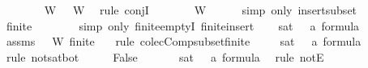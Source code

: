 \begin{isabellebody}
\ \ \ \ \isamarkupfalse%
\ {\isacartoucheopen}{\isasymbottom}\ {\isasymin}\ W{\isacartoucheclose}\ {\isacartoucheopen}{\isacharbraceleft}{\isacharbraceright}\ {\isasymsubseteq}\ W{\isacartoucheclose}\ \isamarkupfalse%
\ {\isacharparenleft}rule\ conjI{\isacharparenright}\isanewline
\ \ \isamarkupfalse%
\ \isamarkupfalse%
\ {\isachardoublequoteopen}{\isacharbraceleft}{\isasymbottom}{\isacharbraceright}\ {\isasymsubseteq}\ W{\isachardoublequoteclose}\isanewline
\ \ \ \ \isamarkupfalse%
\ {\isacharparenleft}simp\ only{\isacharcolon}\ insert{\isacharunderscore}subset{\isacharparenright}\isanewline
\ \ \isamarkupfalse%
\ {\isachardoublequoteopen}finite\ {\isacharbraceleft}{\isasymbottom}{\isacharbraceright}{\isachardoublequoteclose}\ \isanewline
\ \ \ \ \isamarkupfalse%
\ {\isacharparenleft}simp\ only{\isacharcolon}\ finite{\isachardot}emptyI\ finite{\isacharunderscore}insert{\isacharparenright}\isanewline
\ \ \isamarkupfalse%
\ {\isachardoublequoteopen}sat\ {\isacharbraceleft}{\isasymbottom}\ {\isacharcolon}{\isacharcolon}\ {\isacharprime}a\ formula{\isacharbraceright}{\isachardoublequoteclose}\ \isanewline
\ \ \ \ \isamarkupfalse%
\ assms\ {\isacartoucheopen}{\isacharbraceleft}{\isasymbottom}{\isacharbraceright}\ {\isasymsubseteq}\ W{\isacartoucheclose}\ {\isacartoucheopen}finite\ {\isacharbraceleft}{\isasymbottom}{\isacharbraceright}{\isacartoucheclose}\ \isamarkupfalse%
\ {\isacharparenleft}rule\ colecComp{\isacharunderscore}subset{\isacharunderscore}finite{\isacharparenright}\isanewline
\ \ \isamarkupfalse%
\ {\isachardoublequoteopen}{\isasymnot}\ sat\ {\isacharbraceleft}{\isasymbottom}\ {\isacharcolon}{\isacharcolon}\ {\isacharprime}a\ formula{\isacharbraceright}{\isachardoublequoteclose}\ \isanewline
\ \ \ \ \isamarkupfalse%
\ {\isacharparenleft}rule\ not{\isacharunderscore}sat{\isacharunderscore}bot{\isacharparenright}\isanewline
\ \ \isamarkupfalse%
\ \isamarkupfalse%
\ False\ \isanewline
\ \ \ \ \isamarkupfalse%
\ {\isacartoucheopen}sat\ {\isacharbraceleft}{\isasymbottom}\ {\isacharcolon}{\isacharcolon}\ {\isacharprime}a\ formula{\isacharbraceright}{\isacartoucheclose}\ \isamarkupfalse%
\ {\isacharparenleft}rule\ notE{\isacharparenright}\isanewline
{}\isamarkupfalse%
%
\endisatagproof
{\isafoldproof}%
%
\isadelimproof
%
\endisadelimproof
%
\begin{isamarkuptext}%

\end{isamarkuptext}
\end{isabellebody}
